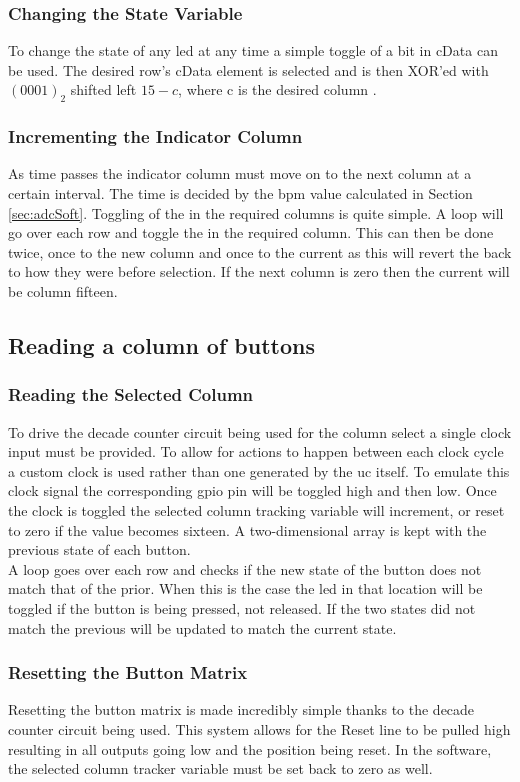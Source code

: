 \documentclass[12pt,a4paper]{report}
\begin{document}
\subsubsection{Changing the State Variable}
To change the state of any \ac{led} at any time a simple toggle of a bit in cData can be used. The desired row's cData element is selected and is then XOR'ed with $(0001)_2$ shifted left $15-c$, where c is the desired column \cite{xor}.
\subsubsection{Incrementing the Indicator Column}
As time passes the indicator column must move on to the next column at a certain interval. The time is decided by the \ac{bpm} value calculated in Section \ref{sec:adcSoft}. Toggling of the  in the required columns is quite simple. A loop will go over each row and toggle the  in the required column. This can then be done twice, once to the new column and once to the current as this will revert the  back to how they were before selection. If the next column is zero then the current will be column fifteen.
\subsection{Reading a column of buttons}
\subsubsection{Reading the Selected Column}
To drive the decade counter circuit being used for the column select a single clock input must be provided. To allow for actions to happen between each clock cycle a custom clock is used rather than one generated by the \ac{uc} itself. To emulate this clock signal the corresponding \ac{gpio} pin will be toggled high and then low. Once the clock is toggled the selected column tracking variable will increment, or reset to zero if the value becomes sixteen. A two-dimensional array is kept with the previous state of each button.\\
A loop goes over each row and checks if the new state of the button does not match that of the prior. When this is the case the \ac{led} in that location will be toggled if the button is being pressed, not released. If the two states did not match the previous will be updated to match the current state.
\subsubsection{Resetting the Button Matrix}
Resetting the button matrix is made incredibly simple thanks to the decade counter circuit being used. This system allows for the Reset line to be pulled high resulting in all outputs going low and the position being reset. In the software, the selected column tracker variable must be set back to zero as well.
\end{document}
